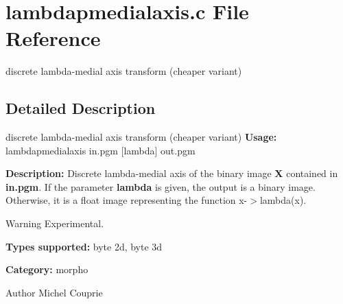 \section{lambdapmedialaxis.c File Reference}
\label{lambdapmedialaxis_8c}


discrete lambda-\/medial axis transform (cheaper variant)  




\subsection{Detailed Description}
discrete lambda-\/medial axis transform (cheaper variant) {\bfseries Usage:} lambdapmedialaxis in.pgm [lambda] out.pgm

{\bfseries Description:} Discrete lambda-\/medial axis of the binary image {\bfseries X} contained in {\bfseries in.pgm}. If the parameter {\bfseries lambda} is given, the output is a binary image. Otherwise, it is a float image representing the function x-\/$>$lambda(x).

\begin{DoxyWarning}{Warning}
Experimental.
\end{DoxyWarning}
{\bfseries Types supported:} byte 2d, byte 3d

{\bfseries Category:} morpho

\begin{DoxyAuthor}{Author}
Michel Couprie 
\end{DoxyAuthor}
